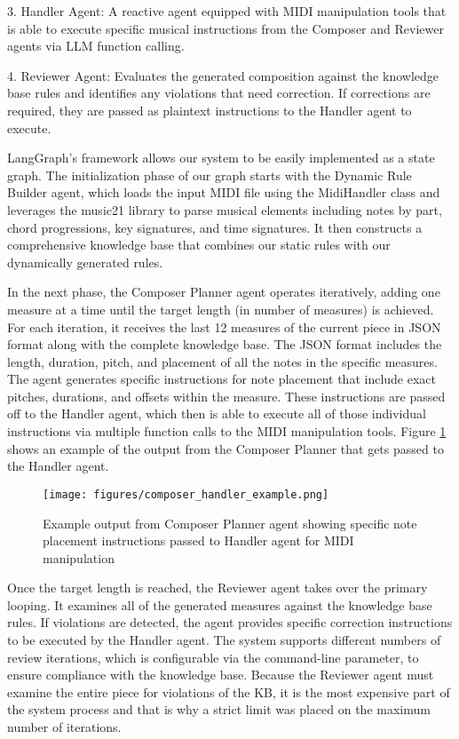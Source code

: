 \documentclass[conference]{IEEEtran}
\begin{document}
3. Handler Agent: A reactive agent equipped with MIDI manipulation tools that is able to execute specific musical instructions from the Composer and Reviewer agents via LLM function calling. 

4. Reviewer Agent: Evaluates the generated composition against the knowledge base rules and identifies any violations that need correction. If corrections are required, they are passed as plaintext instructions to the Handler agent to execute. 

LangGraph's framework allows our system to be easily implemented as a state graph. The initialization phase of our graph starts with the Dynamic Rule Builder agent, which loads the input MIDI file using the MidiHandler class and leverages the music21 library to parse musical elements including notes by part, chord progressions, key signatures, and time signatures. It then constructs a comprehensive knowledge base that combines our static rules with our dynamically generated rules. 

In the next phase, the Composer Planner agent operates iteratively, adding one measure at a time until the target length (in number of measures) is achieved. For each iteration, it receives the last 12 measures of the current piece in JSON format along with the complete knowledge base. The JSON format includes the length, duration, pitch, and placement of all the notes in the specific measures. The agent generates specific instructions for note placement that include exact pitches, durations, and offsets within the measure. These instructions are passed off to the Handler agent, which then is able to execute all of those individual instructions via multiple function calls to the MIDI manipulation tools. Figure \ref{fig:composer_handler} shows an example of the output from the Composer Planner that gets passed to the Handler agent.

\begin{figure}[htbp]
\centering
\texttt{[image: figures/composer\_handler\_example.png]}
\caption{Example output from Composer Planner agent showing specific note placement instructions passed to Handler agent for MIDI manipulation}
\label{fig:composer_handler}
\end{figure} 

Once the target length is reached, the Reviewer agent takes over the primary looping. It examines all of the generated measures against the knowledge base rules. If violations are detected, the agent provides specific correction instructions to be executed by the Handler agent. The system supports different numbers of review iterations, which is configurable via the command-line parameter, to ensure compliance with the knowledge base. Because the Reviewer agent must examine the entire piece for violations of the KB, it is the most expensive part of the system process and that is why a strict limit was placed on the maximum number of iterations. 
\end{document}
